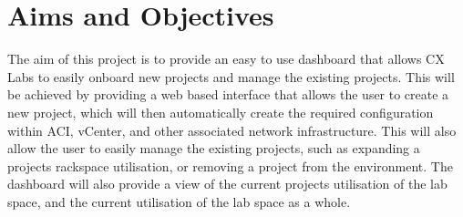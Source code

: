 \section{Aims and Objectives}
\label{intro:aims}

The aim of this project is to provide an easy to use dashboard that allows
CX Labs to easily onboard new projects and manage the existing projects. This
will be achieved by providing a web based interface that allows the user to
create a new project, which will then automatically create the required
configuration within ACI, vCenter, and other associated network infrastructure.
This will also allow the user to easily manage the existing projects, such as
expanding a projects rackspace utilisation, or removing a project from the
environment. The dashboard will also provide a view of the current projects
utilisation of the lab space, and the current utilisation of the lab space as a
whole. 
